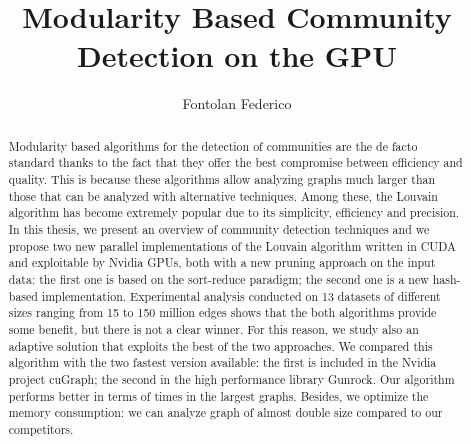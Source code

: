 \documentclass[12pt,a4paper,titlepage]{article}
\title{Modularity Based Community Detection on the GPU}
\author{Fontolan Federico}
\begin{document}
	
	
	\begin{abstract}
		Modularity based algorithms for the detection of communities are the de facto standard thanks to the fact that they offer the best compromise between efficiency and quality. 
		This is because these algorithms allow analyzing graphs much larger than those that can be analyzed with alternative techniques. Among these, the Louvain algorithm has become extremely popular due to its simplicity, efficiency and precision.
		In this thesis, we present an overview of community detection techniques and we propose two new parallel implementations of the Louvain algorithm written in CUDA and exploitable by Nvidia GPUs, both with a new pruning approach on the input data: the first one is based on the sort-reduce paradigm; the second one is a new hash-based implementation. Experimental analysis conducted on 13 datasets of different sizes ranging from 15 to 150 million edges shows that the both algorithms provide some benefit, but there is not a clear winner. For this reason, we study also an adaptive solution that exploits the best of the two approaches. We compared this algorithm with the two fastest version available: the first is included in the Nvidia project cuGraph; the second in the high performance library Gunrock. Our algorithm performs better in terms of times in the largest graphs. Besides, we optimize the memory consumption: we can analyze graph of almost double size compared to our competitors. 
	\end{abstract}
\end{document}

